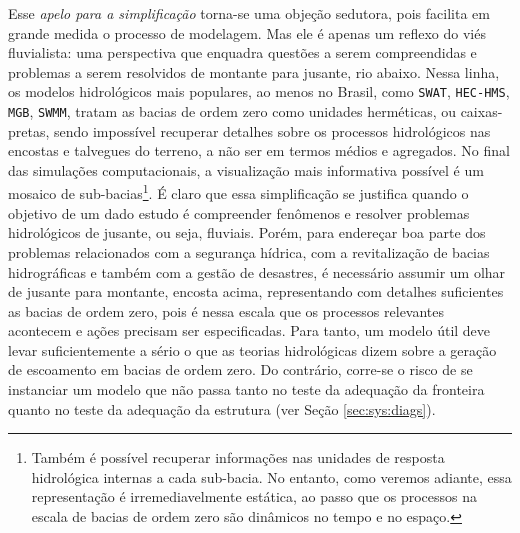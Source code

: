 \documentclass[./main.tex]{subfiles}
\begin{document}
\par  Esse \textit{apelo para a simplificação} torna-se uma objeção sedutora, pois facilita em grande medida o processo de modelagem. Mas ele é apenas um reflexo do viés fluvialista: uma perspectiva que enquadra questões a serem compreendidas e problemas a serem resolvidos de montante para jusante, rio abaixo. Nessa linha, os modelos hidrológicos mais populares, ao menos no Brasil, como \texttt{SWAT}, \texttt{HEC-HMS}, \texttt{MGB}, \texttt{SWMM}, tratam as bacias de ordem zero como unidades herméticas, ou caixas-pretas, sendo impossível recuperar detalhes sobre os processos hidrológicos nas encostas e talvegues do terreno, a não ser em termos médios e agregados. No final das simulações computacionais, a visualização mais informativa possível é um mosaico de sub-bacias\footnote{Também é possível recuperar informações nas unidades de resposta hidrológica internas a cada sub-bacia. No entanto, como veremos adiante, essa representação é irremediavelmente estática, ao passo que os processos na escala de bacias de ordem zero são dinâmicos no tempo e no espaço.}. É claro que essa simplificação se justifica quando o objetivo de um dado estudo é compreender fenômenos e resolver problemas hidrológicos de jusante, ou seja, fluviais. Porém, para endereçar boa parte dos problemas relacionados com a segurança hídrica, com a revitalização de bacias hidrográficas e também com a gestão de desastres, é necessário assumir um olhar de jusante para montante, encosta acima, representando com detalhes suficientes as bacias de ordem zero, pois é nessa escala que os processos relevantes acontecem e ações precisam ser especificadas. Para tanto, um modelo útil deve levar suficientemente a sério o que as teorias hidrológicas dizem sobre a geração de escoamento em bacias de ordem zero. Do contrário, corre-se o risco de se instanciar um modelo que não passa tanto no teste da adequação da fronteira quanto no teste da adequação da estrutura (ver Seção \ref{sec:sys:diags}). 
\end{document}
